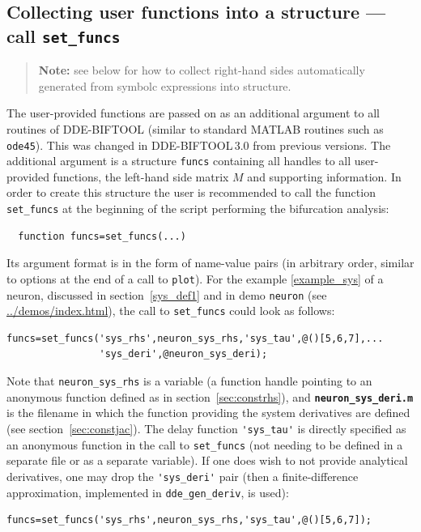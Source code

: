 \documentclass[10pt]{scrartcl}
\newcommand{\DDEBIFCODE}{\textsc{DDE-BIFTOOL}}
\newcommand{\file}[1]{\textbf{\texttt{#1}}}
\newcommand{\demobase}{\url{../demos/index.html}}
\newcommand{\blist}[1]{\mbox{\lstinline!#1!}}
\begin{document}
\subsection{Collecting user functions into a structure --- call
  \texorpdfstring{\blist{set_funcs}}{set\_funcs}}
\label{sec:funcs}
\begin{quote}
  \textbf{Note:} see below for how to collect right-hand sides
  automatically generated from symbolc expressions into structure.
\end{quote}
The user-provided functions are passed on as an additional argument to
all routines of \DDEBIFCODE{} (similar to standard MATLAB routines
such as \blist{ode45}). This was changed in \DDEBIFCODE{}\,3.0 from
previous versions. The additional argument is a structure
\blist{funcs} containing all handles to all user-provided functions,
the left-hand side matrix $M$ and supporting information. In order to
create this structure the user is recommended to call the function
\blist{set_funcs} at the beginning of the script performing the
bifurcation analysis:
\begin{lstlisting}
  function funcs=set_funcs(...)
\end{lstlisting}
Its argument format is in the form of name-value pairs (in arbitrary
order, similar to options at the end of a call to \blist{plot}). For
the example \eqref{example_sys} of a neuron, discussed in
section~\ref{sys_def1} and in demo \texttt{neuron} (see
\demobase{}), the call to \blist{set_funcs} could look as
follows:
\begin{lstlisting}
funcs=set_funcs('sys_rhs',neuron_sys_rhs,'sys_tau',@()[5,6,7],...
                'sys_deri',@neuron_sys_deri);
\end{lstlisting}
Note that \blist{neuron_sys_rhs} is a variable (a function handle
pointing to an anonymous function defined as in
section~\ref{sec:constrhs}), and \file{neuron\_sys\_deri.m} is the
filename in which the function providing the system derivatives are
defined (see section~\ref{sec:constjac}). The delay function
\blist{'sys_tau'} is directly specified as an anonymous function in
the call to \blist{set_funcs} (not needing to be defined in a separate
file or as a separate variable). If one does wish to not provide
analytical derivatives, one may drop the \blist{'sys_deri'} pair (then
a finite-difference approximation, implemented in \blist{dde_gen_deriv}, is
used):
\begin{lstlisting}
funcs=set_funcs('sys_rhs',neuron_sys_rhs,'sys_tau',@()[5,6,7]);
\end{lstlisting}
\end{document}
